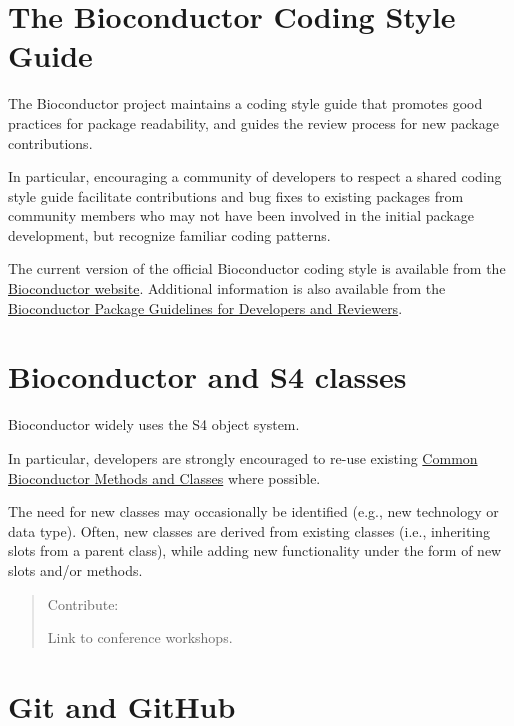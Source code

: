 \documentclass[
]{book}
\begin{document}
\hypertarget{style-guide}{%
\chapter{The Bioconductor Coding Style Guide}\label{style-guide}}

The Bioconductor project maintains a coding style guide that promotes good practices for package readability, and guides the review process for new package contributions.

In particular, encouraging a community of developers to respect a shared coding style guide facilitate contributions and bug fixes to existing packages from community members who may not have been involved in the initial package development, but recognize familiar coding patterns.

The current version of the official Bioconductor coding style is available from the \href{https://bioconductor.org/developers/how-to/coding-style/}{Bioconductor website}.
Additional information is also available from the \href{http://contributions.bioconductor.org/}{Bioconductor Package Guidelines for Developers and Reviewers}.

\hypertarget{s4}{%
\chapter{Bioconductor and S4 classes}\label{s4}}

Bioconductor widely uses the S4 object system.

In particular, developers are strongly encouraged to re-use existing \href{https://bioconductor.org/developers/how-to/commonMethodsAndClasses/}{Common Bioconductor Methods and Classes} where possible.

The need for new classes may occasionally be identified (e.g., new technology or data type).
Often, new classes are derived from existing classes (i.e., inheriting slots from a parent class), while adding new functionality under the form of new slots and/or methods.

\begin{quote}
Contribute:

Link to conference workshops.
\end{quote}

\hypertarget{git-github}{%
\chapter{Git and GitHub}\label{git-github}}
\end{document}
